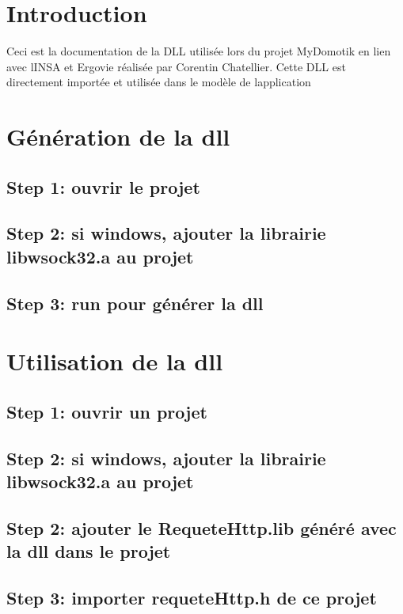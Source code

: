 \hypertarget{index_intro_sec}{}\section{Introduction}\label{index_intro_sec}
Ceci est la documentation de la D\+LL utilisée lors du projet My\+Domotik en lien avec l\textquotesingle{}I\+N\+SA et Ergovie réalisée par Corentin Chatellier. Cette D\+LL est directement importée et utilisée dans le modèle de l\textquotesingle{}application\hypertarget{index_install_sec}{}\section{Génération de la dll}\label{index_install_sec}
\hypertarget{index_step1}{}\subsection{Step 1\+: ouvrir le projet}\label{index_step1}
\hypertarget{index_step2}{}\subsection{Step 2\+: si windows, ajouter la librairie libwsock32.\+a au projet}\label{index_step2}
\hypertarget{index_step3}{}\subsection{Step 3\+: run pour générer la dll}\label{index_step3}
\hypertarget{index_use_sec}{}\section{Utilisation de la dll}\label{index_use_sec}
\hypertarget{index_step21}{}\subsection{Step 1\+: ouvrir un projet}\label{index_step21}
\hypertarget{index_step222}{}\subsection{Step 2\+: si windows, ajouter la librairie libwsock32.\+a au projet}\label{index_step222}
\hypertarget{index_step22}{}\subsection{Step 2\+: ajouter le Requete\+Http.\+lib généré avec la dll dans le projet}\label{index_step22}
\hypertarget{index_step23}{}\subsection{Step 3\+: importer requete\+Http.\+h de ce projet}\label{index_step23}
